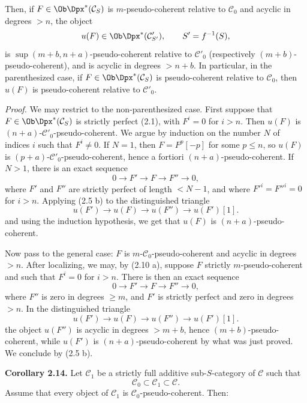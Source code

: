 \documentclass[11pt]{article}
\begin{document}
Then, if \(F\in\Ob\Dpx^*(\mathcal C_S)\) is \(m\)-pseudo-coherent relative to \(\mathcal C_0\) and acyclic in degrees \(>n\), the object
\[
  u(F)\in\Ob\Dpx^*(\mathcal C'_{S'}),\qquad S'=f^{-1}(S),
\]
is \(\sup(m+b,n+a)\)-pseudo-coherent relative to \(\mathcal C'_0\) (respectively \((m+b)\)-pseudo-coherent), and is acyclic in degrees \(>n+b\). In particular, in the parenthesized case, if \(F\in\Ob\Dpx^*(\mathcal C_S)\) is pseudo-coherent relative to \(\mathcal C_0\), then \(u(F)\) is pseudo-coherent relative to \(\mathcal C'_0\).

\emph{Proof.} We may restrict to the non-parenthesized case. First suppose that \(F\in\Ob\Dpx^*(\mathcal C_S)\) is strictly perfect (2.1), with \(F^i=0\) for \(i>n\). Then \(u(F)\) is \((n+a)\)-\(\mathcal C'_0\)-pseudo-coherent. We argue by induction on the number \(N\) of indices \(i\) such that \(F^i\neq0\). If \(N=1\), then \(F=F^p[-p]\) for some \(p\leq n\), so \(u(F)\) is \((p+a)\)-\(\mathcal C'_0\)-pseudo-coherent, hence a fortiori \((n+a)\)-pseudo-coherent. If \(N>1\), there is an exact sequence
\[
  0\longrightarrow F'\longrightarrow F\longrightarrow F''\longrightarrow 0,
\]
where \(F'\) and \(F''\) are strictly perfect of length \(<N-1\), and where \(F'^i=F''^i=0\) for \(i>n\). Applying (2.5 b) to the distinguished triangle
\[
  u(F')\longrightarrow u(F)\longrightarrow u(F'')\longrightarrow u(F')[1].
\]
and using the induction hypothesis, we get that \(u(F)\) is \((n+a)\)-pseudo-coherent.

Now pass to the general case: \(F\) is \(m\)-\(\mathcal C_0\)-pseudo-coherent and acyclic in degrees \(>n\). After localizing, we may, by (2.10 a), suppose \(F\) strictly \(m\)-pseudo-coherent and such that \(F^i=0\) for \(i>n\). There is then an exact sequence
\[
  0\longrightarrow F'\longrightarrow F\longrightarrow F''\longrightarrow 0,
\]
where \(F''\) is zero in degrees \(\geq m\), and \(F'\) is strictly perfect and zero in degrees \(>n\). In the distinguished triangle
\[
  u(F')\longrightarrow u(F)\longrightarrow u(F'')\longrightarrow u(F')[1].
\]
the object \(u(F'')\) is acyclic in degrees \(>m+b\), hence \((m+b)\)-pseudo-coherent, while \(u(F')\) is \((n+a)\)-pseudo-coherent by what was just proved. We conclude by (2.5 b).

\textbf{Corollary 2.14.} Let \(\mathcal C_1\) be a strictly full additive sub-\(S\)-category of \(\mathcal C\) such that
\[
  \mathcal C_0\subset \mathcal C_1\subset \mathcal C.
\]
Assume that every object of \(\mathcal C_1\) is \(\mathcal C_0\)-pseudo-coherent. Then:
\end{document}
